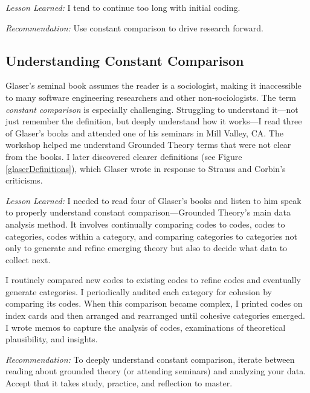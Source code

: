 \textit{Lesson Learned:} I tend to continue too long with initial coding. 

\textit{Recommendation:} Use constant comparison to drive research forward.
\subsection{Understanding Constant Comparison}
Glaser's seminal book assumes the reader is a sociologist, making it inaccessible to many software engineering researchers and other non-sociologists. The term \textit{constant comparison} is especially challenging. Struggling to understand it---not just remember the definition, but deeply understand how it works---I read three of Glaser's books \cite{GlaserDiscovery, GlaserIssues, GlaserTheoreticalSensitivity} and attended one of his seminars in Mill Valley, CA. The workshop helped me understand Grounded Theory terms that were not clear from the books. I later discovered clearer definitions \cite{GlaserBasics} (see Figure \ref{glaserDefinitions}), which Glaser wrote in response to Strauss and Corbin's \cite{Strauss1988Basics} criticisms.

\textit{Lesson Learned:} I needed to read four of Glaser's books and listen to him speak to properly understand constant comparison---Grounded Theory's main data analysis method. It involves continually comparing codes to codes, codes to categories, codes within a category, and comparing categories to categories not only to generate and refine emerging theory but also to decide what data to collect next.

I routinely compared new codes to existing codes to refine codes and eventually generate categories. I periodically audited each category for cohesion by comparing its codes. When this comparison became complex, I printed codes on index cards and then arranged and rearranged until cohesive categories emerged. I wrote memos to capture the analysis of codes, examinations of theoretical plausibility, and insights.

\textit{Recommendation:} To deeply understand constant comparison, iterate between reading about grounded theory (or attending seminars) and analyzing your data. Accept that it takes study, practice, and reflection to master. 



